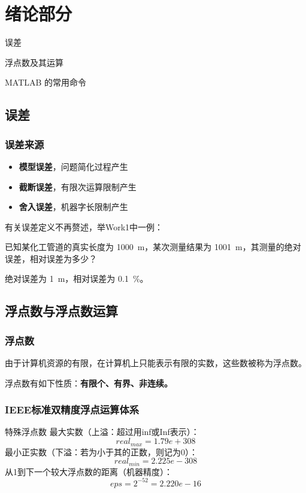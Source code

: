 \chapter*{绪论部分}
\begin{introduction}
\item 误差
\item 浮点数及其运算
\item MATLAB 的常用命令
\end{introduction}
\section{误差}
\subsection{误差来源}
\begin{itemize}
  \item \textbf{模型误差}，问题简化过程产生
  \item \textbf{截断误差}，有限次运算限制产生
  \item \textbf{舍入误差}，机器字长限制产生
\end{itemize}
有关误差定义不再赘述，举Work1中一例：
\begin{problem}
已知某化工管道的真实长度为 \SI{1000}{m}，某次测量结果为 \SI{1001}{m}，其测量的绝对误差，相对误差为多少？
\end{problem}

\begin{solution}
绝对误差为 \SI{1}{m}，相对误差为 \SI{0.1}{\percent}。
\end{solution}

\section{浮点数与浮点数运算}
\subsection{浮点数}
由于计算机资源的有限，在计算机上只能表示有限的实数，这些数被称为浮点数。

浮点数有如下性质：\textbf{有限个、有界、非连续。}
\subsection{IEEE标准双精度浮点运算体系}

\begin{definition}{特殊浮点数}{}
最大实数（上溢：超过用inf或Inf表示）：
\[real_{max}=1.79e+308
\]
最小正实数（下溢：若为小于其的正数，则记为0）：
\[real_{min}=2.225e-308
\]
从1到下一个较大浮点数的距离（机器精度）：
\[eps=2^{-52}=2.220e-16
\]
\end{definition}
